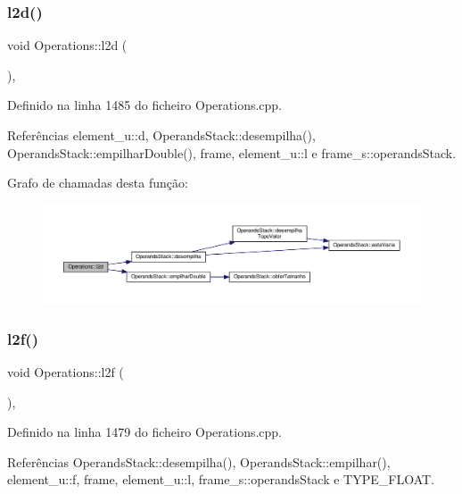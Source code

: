 \subsubsection{\texorpdfstring{l2d()}{l2d()}}
{\footnotesize\ttfamily void Operations\+::l2d (\begin{DoxyParamCaption}{ }\end{DoxyParamCaption})\hspace{0.3cm}{\ttfamily [static]}, {\ttfamily [private]}}



Definido na linha 1485 do ficheiro Operations.\+cpp.



Referências element\+\_\+u\+::d, Operands\+Stack\+::desempilha(), Operands\+Stack\+::empilhar\+Double(), frame, element\+\_\+u\+::l e frame\+\_\+s\+::operands\+Stack.

Grafo de chamadas desta função\+:
\nopagebreak
\begin{figure}[H]
\begin{center}
\leavevmode
\includegraphics[width=350pt]{classOperations_aab1532a2f22ab943a1ec37e33ae742b3_cgraph}
\end{center}
\end{figure}
\mbox{\label{classOperations_af2064cce9ba6f6a4be257354f21f537e}} 
\subsubsection{\texorpdfstring{l2f()}{l2f()}}
{\footnotesize\ttfamily void Operations\+::l2f (\begin{DoxyParamCaption}{ }\end{DoxyParamCaption})\hspace{0.3cm}{\ttfamily [static]}, {\ttfamily [private]}}



Definido na linha 1479 do ficheiro Operations.\+cpp.



Referências Operands\+Stack\+::desempilha(), Operands\+Stack\+::empilhar(), element\+\_\+u\+::f, frame, element\+\_\+u\+::l, frame\+\_\+s\+::operands\+Stack e T\+Y\+P\+E\+\_\+\+F\+L\+O\+AT.

